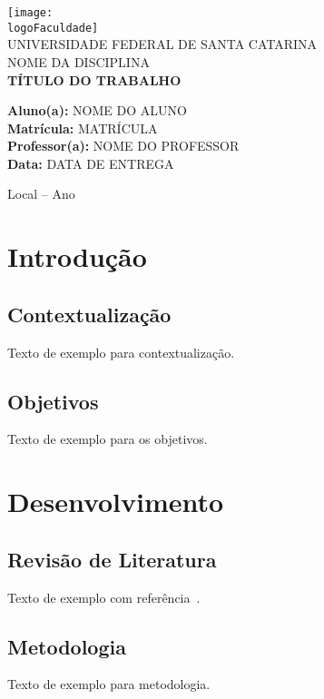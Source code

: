 \documentclass[12pt]{article}
\newcommand{\nomeAluno}{NOME DO ALUNO}
\newcommand{\matricula}{MATRÍCULA}
\newcommand{\nomeProfessor}{NOME DO PROFESSOR}
\newcommand{\disciplina}{NOME DA DISCIPLINA}
\newcommand{\tituloTrabalho}{TÍTULO DO TRABALHO}
\newcommand{\dataEntrega}{DATA DE ENTREGA}
\newcommand{\logoFaculdade}{logo_ufsc.png} %
\begin{document}
\begin{titlepage}
    \begin{center}
        \texttt{[image: \\logoFaculdade]} \\[1cm]
        {\large UNIVERSIDADE FEDERAL DE SANTA CATARINA}\\[0.5cm]
        {\large \disciplina}\\[3cm]
        {\LARGE \textbf{\tituloTrabalho}}\\[3cm]
        \begin{flushright}
            \textbf{Aluno(a):} \nomeAluno\\
            \textbf{Matrícula:} \matricula\\
            \textbf{Professor(a):} \nomeProfessor\\
            \textbf{Data:} \dataEntrega\\
        \end{flushright}
        \vfill
        {\large Local – Ano}
    \end{center}
\end{titlepage}

\tableofcontents
\newpage

\section{Introdução}
\subsection{Contextualização}
Texto de exemplo para contextualização.

\subsection{Objetivos}
Texto de exemplo para os objetivos.

\section{Desenvolvimento}
\subsection{Revisão de Literatura}
Texto de exemplo com referência~\cite{livro_exemplo}.

\subsection{Metodologia}
Texto de exemplo para metodologia.
\end{document}
